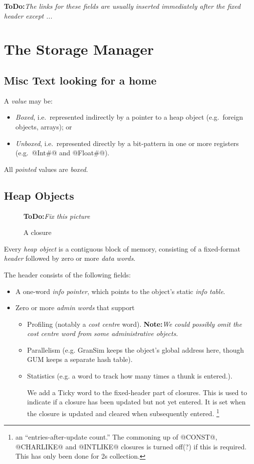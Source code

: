 \documentclass[11pt]{article}
\newcommand{\note}[1]{{{\bf Note:}\sl #1}}
\newcommand{\ToDo}[1]{{{\bf ToDo:}\sl #1}}
\newcommand{\Section}[2]{\section{#1}\label{sec:#2}}
\newcommand{\Subsection}[2]{\subsection{#1}\label{sec:#2}}
\begin{document}
\ToDo{The links for these fields are usually inserted immediately
after the fixed header except ...}



\Section{The Storage Manager}{storage-manager-internals}

\subsection{Misc Text looking for a home}

A \emph{value} may be:
\begin{itemize}
\item \emph{Boxed}, i.e.~represented indirectly by a pointer to a heap object (e.g.~foreign objects, arrays); or
\item \emph{Unboxed}, i.e.~represented directly by a bit-pattern in one or more registers (e.g.~@Int#@ and @Float#@).
\end{itemize}
All \emph{pointed} values are \emph{boxed}.  


\Subsection{Heap Objects}{heap-objects}
\label{sec:fixed-header}

\begin{figure}
\begin{center}

\end{center}
\ToDo{Fix this picture}
\caption{A closure}
\label{fig:closure}
\end{figure}

Every \emph{heap object} is a contiguous block of memory, consisting
of a fixed-format \emph{header} followed by zero or more \emph{data
words}.

The header consists of the following fields:
\begin{itemize}
\item A one-word \emph{info pointer}, which points to
the object's static \emph{info table}.
\item Zero or more \emph{admin words} that support
\begin{itemize}
\item Profiling (notably a \emph{cost centre} word).
  \note{We could possibly omit the cost centre word from some 
  administrative objects.}
\item Parallelism (e.g. GranSim keeps the object's global address here,
though GUM keeps a separate hash table).
\item Statistics (e.g. a word to track how many times a thunk is entered.).

We add a Ticky word to the fixed-header part of closures.  This is
used to indicate if a closure has been updated but not yet entered. It
is set when the closure is updated and cleared when subsequently
entered.  \footnote{%
an ``entries-after-update count.''  The commoning up of @CONST@,
@CHARLIKE@ and @INTLIKE@ closures is turned off(?) if this is
required. This has only been done for 2s collection.  }

\end{itemize}
\end{itemize}
\end{document}
